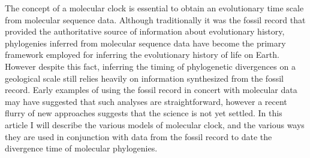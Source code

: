 The concept of a molecular clock is essential to obtain an evolutionary time scale from molecular sequence data.
Although traditionally it was the fossil record that provided the authoritative source of information about evolutionary history, phylogenies inferred from molecular sequence data have become the primary framework employed for inferring the evolutionary history of life on Earth. However despite this fact, inferring the timing of phylogenetic divergences on a geological scale still relies heavily on information synthesized from the fossil record. Early examples of using the fossil record in concert with molecular data may have suggested that such analyses are straightforward, however a recent flurry of new approaches suggests that the science is not yet settled. In this article I will describe the various models of molecular clock, and the various ways they are used in conjunction with data from the fossil record to date the divergence time of molecular phylogenies.
  